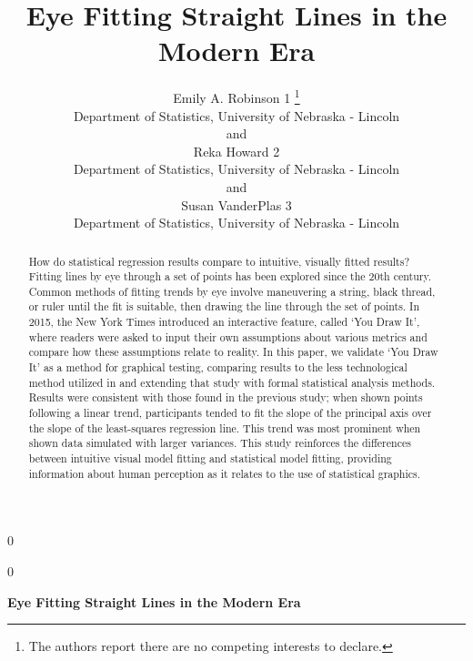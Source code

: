 \documentclass[12pt]{article}
\newcommand{\blind}{0}
\begin{document}
\def\spacingset#1{\renewcommand{\baselinestretch}%
{#1}\small\normalsize} \spacingset{1}



\blind
{
  \title{\bf Eye Fitting Straight Lines in the Modern Era}

  \author{
        Emily A. Robinson 1 \thanks{The authors report there are no
competing interests to declare.} \\
    Department of Statistics, University of Nebraska - Lincoln\\
     and \\     Reka Howard 2 \\
    Department of Statistics, University of Nebraska - Lincoln\\
     and \\     Susan VanderPlas 3 \\
    Department of Statistics, University of Nebraska - Lincoln\\
      }
  \maketitle
} \fi

\blind
{
  \bigskip
  \bigskip
  \bigskip
  \begin{center}
    {\LARGE\bf Eye Fitting Straight Lines in the Modern Era}
  \end{center}
  \medskip
} \fi

\bigskip
\begin{abstract}
How do statistical regression results compare to intuitive, visually
fitted results? Fitting lines by eye through a set of points has been
explored since the 20th century. Common methods of fitting trends by eye
involve maneuvering a string, black thread, or ruler until the fit is
suitable, then drawing the line through the set of points. In 2015, the
New York Times introduced an interactive feature, called `You Draw It',
where readers were asked to input their own assumptions about various
metrics and compare how these assumptions relate to reality. In this
paper, we validate `You Draw It' as a method for graphical testing,
comparing results to the less technological method utilized in
\citet{mosteller1981eye} and extending that study with formal
statistical analysis methods. Results were consistent with those found
in the previous study; when shown points following a linear trend,
participants tended to fit the slope of the principal axis over the
slope of the least-squares regression line. This trend was most
prominent when shown data simulated with larger variances. This study
reinforces the differences between intuitive visual model fitting and
statistical model fitting, providing information about human perception
as it relates to the use of statistical graphics.
\end{abstract}
\end{document}
